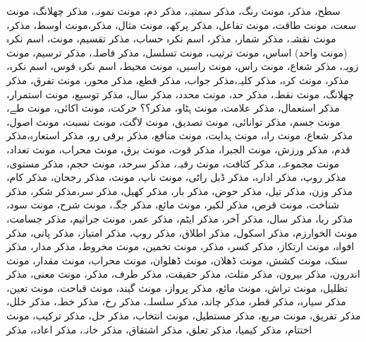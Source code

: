 سطح، مذکر، مونث
رنگ، مذکر
سمتیہ، مذکر
دم، مونث
نمونہ، مذکر
چھلانگ، مونث
سعت، مونث
طاقت، مونث
تفاعل، مذکر
پرکھ، مونث
مثال، مذکر،مونث
اوسط، مذکر، مونث
نقشہ، مذکر
شمار، مذکر، اسم نکرہ
حساب، مذکر
تقسیم، مونث، اسم نکرہ (مونث واحد)
اساس، مونث
ترتیب، مونث
تسلسل، مذکر
فاصلہ، مذکر
ترسیم، مونث
زویہ، مذکر
شعاع، مونث
راس، مونث
راسیں، مونث
محیط، اسم نکرہ
قوس، اسم نکرہ، مذکر، مونث
کرہ، مذکر
کلیہ،مذکر
جواب، مذکر
قطع، مذکر
محور، مونث
تفرق، مذکر
چھلانگ، مونث
نقطہ، مذکر
حد، مونث
محدد، مذکر
سال، مذکر
توسیع، مونث
استمرار، مذکر
استعمال، مذکر
علامت، مونث
ہٹاو، مذکر؟؟
حرکت، مونث
اکائی، مونث
طے، مونث
جسم، مذکر
توانائی، مونث
تصدیق، مونث
لاگت، مونث
نسبت، مونث
اصول، مذکر
شعاع، مونث
راہ، مونث
ہدایت، مونث
منافع، مذکر
برقی رو، مذکر
استعارہ،مذکر
قدم، مذکر
ورزش، مونث
الجبرا، مذکر
قوت، مونث
برق، مونث
محراب، مونث
تعداد، مونث
مجموعہ، مذکر
کثافت، مونث
رقبہ، مذکر
سرحد، مونث
حجم، مذکر
مستوی، مذکر
روپ، مذکر
ادارہ، مذکر
ڈبل راٹی، مونث
ناپ، مونث، مذکر
رجحان، مذکر
کام، مذکر
وزن، مذکر
تیل، مذکر
حوض، مذکر
بار، مذکر
کھیل، مذکر
سر،مذکر
شکر، مذکر
شناخت، مونث
 قرص، مذکر
لکیر، مونث
مائع، مذکر
جگہ، مونث
شرح، مونث
سود، مذکر
ربا، مذکر
سال، مذکر
آخر، مذکر
ایٹم، مذکر
عمر، مونث
جراثیم، مذکر
جسامت، مونث
الخوارزم، مذکر
اسکول، مذکر
اطلاق، مذکر
روپ، مذکر
امتیاز، مذکر
پانی، مذکر
افواہ، مونث
ارتکاز، مذکر
کسر، مذکر، مونث
تخمین، مونث
مخروط، مذکر
مدار، مذکر
سنک، مونث
کشش، مونث
ڈھلان، مونث
ڈھلوان، مونث
محراب، مونث
مقدار، مونث
اندرون، مذکر
بیرون، مذکر
مثلث، مذکر
حقیقت، مذکر
طرف، مذکر، مونث
معنی، مذکر
تظلیل، مونث
تراش، مونث
مائع، مذکر
پرواز، مونث
گیند، مونث
قباحت، مونث
تعین، مذکر
سیارہ، مذکر
قطر، مذکر
چاند، مذکر
سلسلہ، مذکر
رخ، مذکر
خطہ، مذکر
خلل، مذکر
تفریق، مونث
مربع، مذکر
مستطیل، مونث
انتخاب، مذکر
حل، مذکر
ترکیب، مونث
اختتام، مذکر
کیمیا، مذکر
تعلق، مذکر
اشتقاق، مذکر
خانہ، مذکر
اعادہ، مذکر

